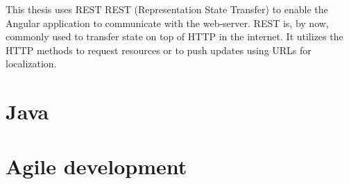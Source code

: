 This thesis uses REST REST (Representation State Transfer) to enable the Angular application to communicate with the web-server.
REST is, by now, commonly used to transfer state on top of HTTP in the internet.
It utilizes the HTTP methods\cite{http:methods} to request resources or to push updates using URLs for localization.


\section{Java}

\section{Agile development}
\label{fundamental:agile}

